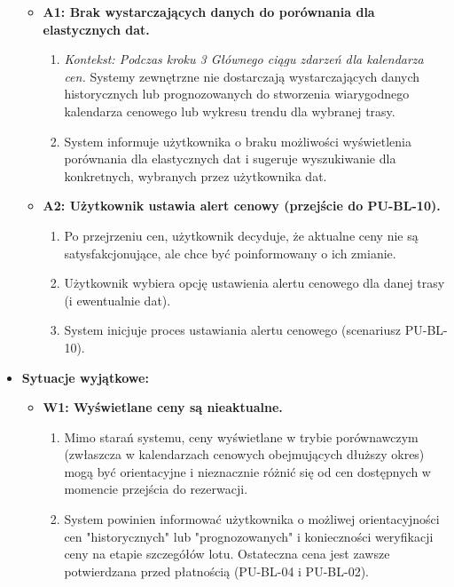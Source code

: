 \documentclass[a4paper,12pt]{article}
\begin{document}
\begin{itemize}
\begin{itemize}
            \item \textbf{A1: Brak wystarczających danych do porównania dla elastycznych dat.}
                \begin{enumerate}
                    \item \textit{Kontekst: Podczas kroku 3 Głównego ciągu zdarzeń dla kalendarza cen.} Systemy zewnętrzne nie dostarczają wystarczających danych historycznych lub prognozowanych do stworzenia wiarygodnego kalendarza cenowego lub wykresu trendu dla wybranej trasy.
                    \item System informuje użytkownika o braku możliwości wyświetlenia porównania dla elastycznych dat i sugeruje wyszukiwanie dla konkretnych, wybranych przez użytkownika dat.
                \end{enumerate}
            \item \textbf{A2: Użytkownik ustawia alert cenowy (przejście do PU-BL-10).}
                \begin{enumerate}
                    \item Po przejrzeniu cen, użytkownik decyduje, że aktualne ceny nie są satysfakcjonujące, ale chce być poinformowany o ich zmianie.
                    \item Użytkownik wybiera opcję ustawienia alertu cenowego dla danej trasy (i ewentualnie dat).
                    \item System inicjuje proces ustawiania alertu cenowego (scenariusz PU-BL-10).
                \end{enumerate}
        \end{itemize}
    \item \textbf{Sytuacje wyjątkowe:}
        \begin{itemize}
             \item \textbf{W1: Wyświetlane ceny są nieaktualne.}
                \begin{enumerate}
                    \item Mimo starań systemu, ceny wyświetlane w trybie porównawczym (zwłaszcza w kalendarzach cenowych obejmujących dłuższy okres) mogą być orientacyjne i nieznacznie różnić się od cen dostępnych w momencie przejścia do rezerwacji.
                    \item System powinien informować użytkownika o możliwej orientacyjności cen "historycznych" lub "prognozowanych" i konieczności weryfikacji ceny na etapie szczegółów lotu. Ostateczna cena jest zawsze potwierdzana przed płatnością (PU-BL-04 i PU-BL-02).
                \end{enumerate}
        \end{itemize}
\end{itemize}
\end{document}
